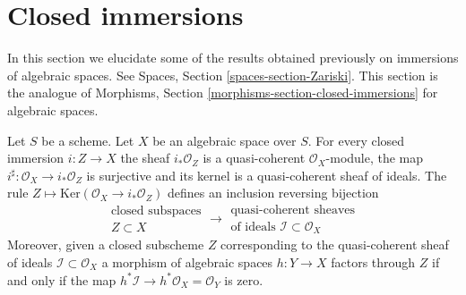 \section{Closed immersions}
\label{section-closed-immersions}

\noindent
In this section we elucidate some of the results obtained previously on
immersions of algebraic spaces. See
Spaces, Section \ref{spaces-section-Zariski}.
This section is the analogue of
Morphisms, Section \ref{morphisms-section-closed-immersions}
for algebraic spaces.

\begin{lemma}
\label{lemma-closed-immersion-ideals}
Let $S$ be a scheme.
Let $X$ be an algebraic space over $S$.
For every closed immersion $i : Z \to X$ the sheaf
$i_*\mathcal{O}_Z$ is a quasi-coherent $\mathcal{O}_X$-module, the map
$i^\sharp : \mathcal{O}_X \to i_*\mathcal{O}_Z$ is surjective and its
kernel is a quasi-coherent sheaf of ideals. The rule
$Z \mapsto \text{Ker}(\mathcal{O}_X \to i_*\mathcal{O}_Z)$
defines an inclusion reversing bijection
$$
\begin{matrix}
\text{closed subspaces}\\
Z \subset X
\end{matrix}
\longrightarrow
\begin{matrix}
\text{quasi-coherent sheaves}\\
\text{of ideals }\mathcal{I} \subset \mathcal{O}_X
\end{matrix}
$$
Moreover, given a closed subscheme $Z$ corresponding to the quasi-coherent
sheaf of ideals $\mathcal{I} \subset \mathcal{O}_X$ a morphism of algebraic
spaces $h : Y \to X$ factors through $Z$ if and only if the map
$h^*\mathcal{I} \to h^*\mathcal{O}_X = \mathcal{O}_Y$ is zero.
\end{lemma}

